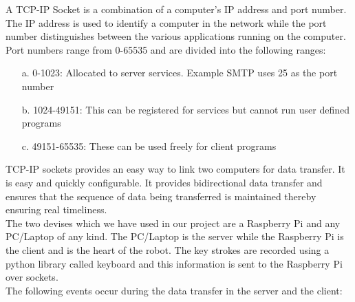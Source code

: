 A TCP-IP Socket is a combination of a computer's IP address and port number. The IP address is used to identify a computer in the network while the port number distinguishes between the various applications running on the computer.\\ Port numbers range from 0-65535 and are divided into the following ranges:
\begin{enumerate}
\item[a.] 0-1023: Allocated to server services. Example SMTP uses 25 as the port number
\item[b.] 1024-49151: This can be registered for services but cannot run user defined programs
\item[c.] 49151-65535: These can be used freely for client programs
\end{enumerate}
TCP-IP sockets provides an easy way to link two computers for data transfer. It is easy and quickly configurable. It provides bidirectional data transfer and ensures that the sequence of data being transferred is maintained thereby ensuring real timeliness.\\
The two devises which we have used in our project are a Raspberry Pi and any PC/Laptop of any kind. The PC/Laptop is the server while the Raspberry Pi is the client and is the heart of the robot. The key strokes are recorded using a python library called keyboard and this information is sent to the Raspberry Pi over sockets.\\
The following events occur during the data transfer in the server and the client:
